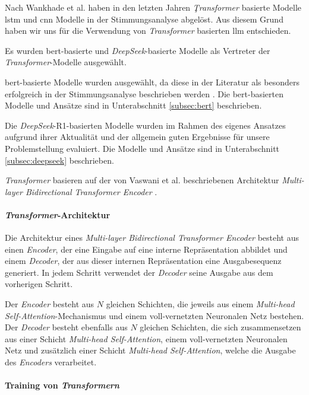 Nach Wankhade et al. \cite{wankhade2022survey} haben in den letzten Jahren \textit{Ţransformer} basierte Modelle \gls{lstm} und \gls{cnn} Modelle in der Stimmungsanalyse abgelöst.
Aus diesem Grund haben wir uns für die Verwendung von \textit{Transformer} basierten \gls{llm} entschieden.

Es wurden \gls{bert}-basierte und \textit{DeepSeek}-basierte Modelle als Vertreter der \textit{Transformer}-Modelle ausgewählt.

\gls{bert}-basierte Modelle wurden ausgewählt, da diese in der Literatur als besonders erfolgreich in der Stimmungsanalyse beschrieben werden \cite{devlin2018bert}.
Die \gls{bert}-basierten Modelle und Ansätze sind in Unterabschnitt \ref{subsec:bert} beschrieben.

Die \textit{DeepSeek}-R1-basierten Modelle wurden im Rahmen des eigenes Ansatzes aufgrund ihrer Aktualität und der allgemein guten Ergebnisse für unsere Problemstellung evaluiert.
Die Modelle und Ansätze sind in Unterabschnitt \ref{subsec:deepseek} beschrieben.

\textit{Transformer} basieren auf der von Vaswani et al. beschriebenen Architektur \textit{Multi-layer Bidirectional Transformer Encoder} \cite{vaswani2017attention}.

\paragraph{\textit{Transformer}-Architektur}
Die Architektur eines \textit{Multi-layer Bidirectional Transformer Encoder} besteht aus einen \textit{Encoder}, der eine Eingabe auf eine interne Repräsentation abbildet und einem \textit{Decoder}, der aus dieser internen Repräsentation eine Ausgabesequenz generiert.
In jedem Schritt verwendet der \textit{Decoder} seine Ausgabe aus dem vorherigen Schritt.

Der \textit{Encoder} besteht aus $N$ gleichen Schichten, die jeweils aus einem \textit{Multi-head Self-Attention}-Mechanismus und einem voll-vernetzten Neuronalen Netz bestehen.
Der \textit{Decoder} besteht ebenfalls aus $N$ gleichen Schichten, die sich zusammensetzen aus einer Schicht \textit{Multi-head Self-Attention}, einem voll-vernetzten Neuronalen Netz und zusätzlich einer Schicht \textit{Multi-head Self-Attention}, welche die Ausgabe des \textit{Encoders} verarbeitet.

\paragraph{Training von \textit{Transformern}}

